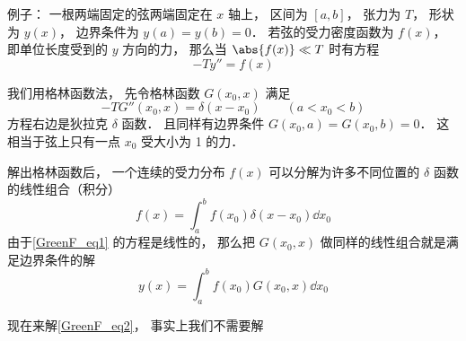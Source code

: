
\begin{issues}
\issueDraft
\end{issues}


例子： 一根两端固定的弦两端固定在 $x$ 轴上， 区间为 $[a, b]$， 张力为 $T$， 形状为 $y(x)$， 边界条件为 $y(a) = y(b) = 0$． 若弦的受力密度函数为 $f(x)$， 即单位长度受到的 $y$ 方向的力， 那么当 $\abs{f(x)} \ll T$ 时有方程
\begin{equation}\label{GreenF_eq1}
-T y'' = f(x)
\end{equation}

我们用格林函数法， 先令格林函数 $G(x_0, x)$ 满足
\begin{equation}\label{GreenF_eq2}
-T G''(x_0, x) = \delta(x - x_0) \qquad (a < x_0 < b)
\end{equation}
方程右边是狄拉克 $\delta$ 函数． 且同样有边界条件 $G(x_0, a) = G(x_0, b) = 0$． 这相当于弦上只有一点 $x_0$ 受大小为 1 的力．

解出格林函数后， 一个连续的受力分布 $f(x)$ 可以分解为许多不同位置的 $\delta$ 函数的线性组合（积分）
\begin{equation}
f(x) = \int_a^b f(x_0) \delta(x - x_0) \dd{x_0}
\end{equation}
由于\autoref{GreenF_eq1} 的方程是线性的， 那么把 $G(x_0, x)$ 做同样的线性组合就是满足边界条件的解
\begin{equation}
y(x) = \int_a^b f(x_0) G(x_0, x) \dd{x_0}
\end{equation}

现在来解\autoref{GreenF_eq2}， 事实上我们不需要解

